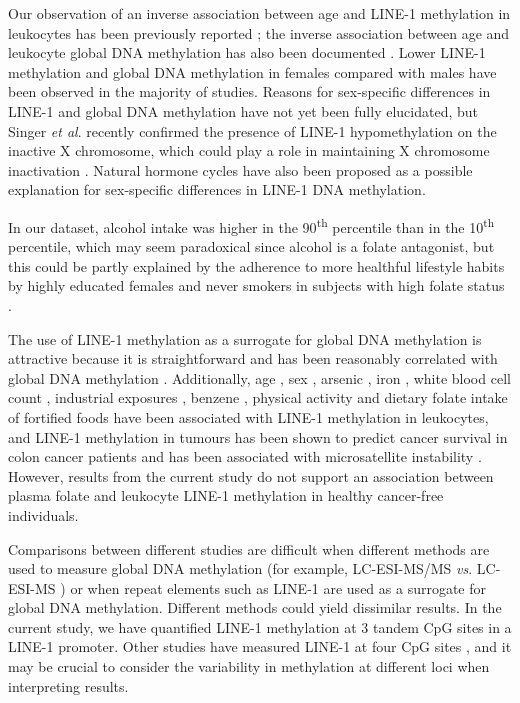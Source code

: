 \noindent Our observation of an inverse association between age and LINE-1 methylation in leukocytes has been previously reported \cite{c37}; the inverse association between age and leukocyte global DNA methylation has also been documented \cite{c38,c39}. Lower LINE-1 methylation \cite{c310,c312} and global DNA methylation \cite{c39} in females compared with males have been observed in the majority of studies. Reasons for sex-specific differences in LINE-1 and global DNA methylation have not yet been fully elucidated, but Singer \emph{et al}. recently confirmed the presence of LINE-1 hypomethylation on the inactive X chromosome, which could play a role in maintaining X chromosome inactivation \cite{c331}. Natural hormone cycles \cite{c332} have also been proposed as a possible explanation for sex-specific differences in LINE-1 DNA methylation.

\noindent In our dataset, alcohol intake was higher in the 90\textsuperscript{th} percentile than in the 10\textsuperscript{th} percentile, which may seem paradoxical since alcohol is a folate antagonist, but this could be partly explained by the adherence to more healthful lifestyle habits by highly educated females and never smokers in subjects with high folate status \cite{c333}.

\noindent The use of LINE-1 methylation as a surrogate for global DNA methylation is attractive because it is straightforward and has been reasonably correlated with global DNA methylation \cite{c328}. Additionally, age \cite{c37,c39}, sex \cite{c310,c313}, arsenic \cite{c311}, iron \cite{c311}, white blood cell count \cite{c310}, industrial exposures \cite{c314}, benzene \cite{c315}, physical activity \cite{c316} and dietary folate intake of fortified foods \cite{c317} have been associated with LINE-1 methylation in leukocytes, and LINE-1 methylation in tumours has been shown to predict cancer survival in colon cancer patients \cite{c334} and has been associated with microsatellite instability \cite{c335}. However, results from the current study do not support an association between plasma folate and leukocyte LINE-1 methylation in healthy cancer-free individuals.

\noindent Comparisons between different studies are difficult when different methods are used to measure global DNA methylation (for example, LC-ESI-MS/MS \cite{c319} \emph{vs}. LC-ESI-MS \cite{c318}) or when repeat elements such as LINE-1 are used as a surrogate for global DNA methylation. Different methods could yield dissimilar results. In the current study, we have quantified LINE-1 methylation at 3 tandem CpG sites in a LINE-1 promoter. Other studies have measured LINE-1 at four CpG sites \cite{c311}, and it may be crucial to consider the variability in methylation at different loci \cite{c331} when interpreting results.

